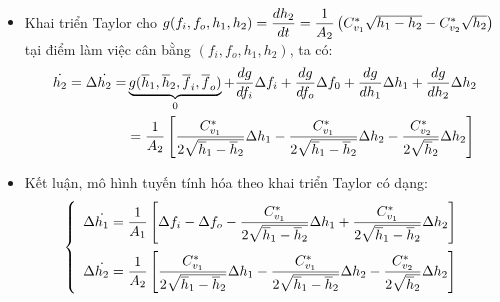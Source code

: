 \begin{itemize}
\begin{align*}
            \end{align*}
        \item Khai triển Taylor cho $g(f_i, f_o, h_1, h_2) = \dfrac{dh_2}{dt} = \dfrac{1}{A_2} \left({C_{v_1}^{*}\sqrt{h_1 - h_2} - C_{v_2}^{*}\sqrt{h_2}}\right)$ tại điểm làm việc cân bằng $(f_i, f_o, h_1, h_2)$, ta có:
            \begin{align*}
                \dot{h_2} = \Delta \dot{h_2} = & \underbrace{g(\overline{h}_1, \overline{h}_2, \overline{f}_i, \overline{f}_o)}_{0} + \dfrac{dg}{df_i}\Delta f_i + \dfrac{dg}{df_o}\Delta f_0 + \dfrac{dg}{dh_1}\Delta h_1 + \dfrac{dg}{dh_2}\Delta h_2 \\
                & = \dfrac{1}{A_2} \left[{\dfrac{C_{v_1}^{*}}{2\sqrt{\overline{h}_1 - \overline{h}_2}} \Delta h_1 - \dfrac{C_{v_1}^{*}}{2\sqrt{\overline{h}_1 - \overline{h}_2}} \Delta h_2 - \dfrac{C_{v_2}^{*}}{2\sqrt{\overline{h}_2}} \Delta h_2}\right]
            \end{align*}
        \item Kết luận, mô hình tuyến tính hóa theo khai triển Taylor có dạng:
            \begin{align*}
                \left\{\begin{array}{l}
                    \Delta \dot{h_1} = \dfrac{1}{A_1} \left[{\Delta f_i - \Delta f_o - \dfrac{C_{v_1}^{*}}{2\sqrt{\overline{h}_1 - \overline{h}_2}} \Delta h_1 + \dfrac{C_{v_1}^{*}}{2\sqrt{\overline{h}_1 - \overline{h}_2}} \Delta h_2}\right]\\ [.5cm]
                    \Delta \dot{h_2} = \dfrac{1}{A_2} \left[{\dfrac{C_{v_1}^{*}}{2\sqrt{\overline{h}_1 - \overline{h}_2}} \Delta h_1 - \dfrac{C_{v_1}^{*}}{2\sqrt{\overline{h}_1 - \overline{h}_2}} \Delta h_2 - \dfrac{C_{v_2}^{*}}{2\sqrt{\overline{h}_2}} \Delta h_2}\right]
                \end{array}\right.
            \end{align*}
    \end{itemize}

